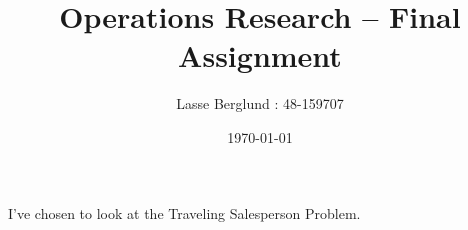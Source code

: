 \documentclass[12pt]{report}
\title{Operations Research -- Final Assignment}
\author{Lasse Berglund : 48-159707}
\date{\today}
\begin{document}
\maketitle

I've chosen to look at the Traveling Salesperson Problem.
\end{document}
